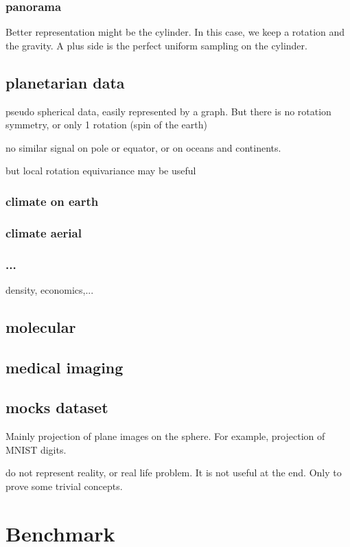\documentclass[11pt]{report}
\begin{document}
\subsection{panorama}
Better representation might be the cylinder. In this case, we keep a rotation and the gravity. A plus side is the perfect uniform sampling on the cylinder.
\section{planetarian data}
pseudo spherical data, easily represented by a graph.
But there is no rotation symmetry, or only 1 rotation (spin of the earth)

no similar signal on pole or equator, or on oceans and continents.

but local rotation equivariance may be useful
\subsection{climate on earth}
\subsection{climate aerial}
\subsection{...}
density, economics,...

\section{molecular}

\section{medical imaging}

\section{mocks dataset}
Mainly projection of plane images on the sphere. For example, projection of MNIST digits.

do not represent reality, or real life problem. It is not useful at the end. Only to prove some trivial concepts.

\chapter{Benchmark}
\end{document}
